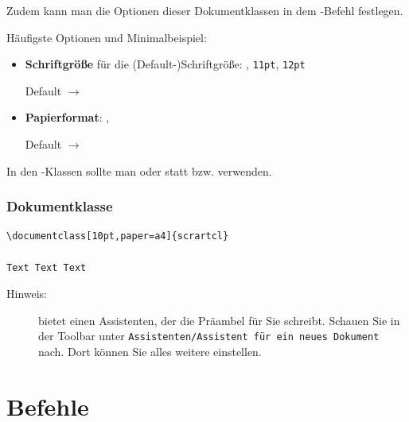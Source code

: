 \begin{frame}[fragile]

Zudem kann man die Optionen dieser Dokumentklassen in dem -Befehl festlegen.

Häufigste Optionen und Minimalbeispiel:

\begin{itemize}
\item \textbf{Schriftgröße} für die (Default-)Schriftgröße: \ltxterm{10pt}, \texttt{11pt}, \texttt{12pt} \par
Default $\rightarrow$ \ltxterm{10pt} 

\item \textbf{Papierformat}: ,  \par
Default $\rightarrow$  \par
\end{itemize}


In den -Klassen sollte man 
oder  statt  bzw.  verwenden.

\end{frame}


\begin{frame}[fragile]
\frametitle{Dokumentklasse}

\begin{lstlisting}
\documentclass[10pt,paper=a4]{scrartcl}

Text Text Text

\end{lstlisting}

\begin{description}
\item[Hinweis:]  bietet einen Assistenten, der die Präambel für Sie schreibt. Schauen Sie in der Toolbar unter \texttt{Assistenten/Assistent für ein neues Dokument} nach. Dort können Sie alles weitere einstellen.
\end{description}

\end{frame}


\section{Befehle}


